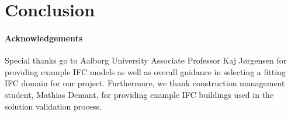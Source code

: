 \section{Conclusion}
\paragraph{Acknowledgements} Special thanks go to Aalborg University Associate Professor Kaj Jørgensen for providing example IFC models as well as overall guidance in selecting a fitting IFC domain for our project. Furthermore, we thank construction management student, Mathias Demant, for providing example IFC buildings used in the solution validation process.